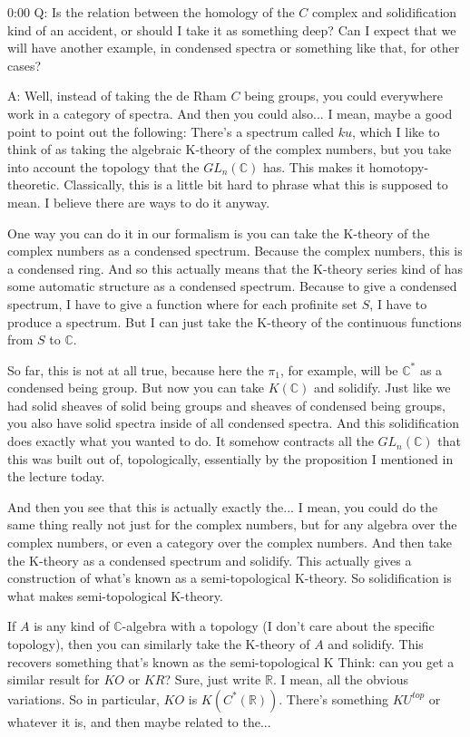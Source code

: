 \begin{unfinished}{0:00}
Q: Is the relation between the homology of the $C$ complex and solidification kind of an accident, or should I take it as something deep? Can I expect that we will have another example, in condensed spectra or something like that, for other cases?

A: Well, instead of taking the de Rham $C$ being groups, you could everywhere work in a category of spectra. And then you could also... I mean, maybe a good point to point out the following: There's a spectrum called $ku$, which I like to think of as taking the algebraic K-theory of the complex numbers, but you take into account the topology that the $GL_n(\mathbb{C})$ has. This makes it homotopy-theoretic. Classically, this is a little bit hard to phrase what this is supposed to mean. I believe there are ways to do it anyway.

One way you can do it in our formalism is you can take the K-theory of the complex numbers as a condensed spectrum. Because the complex numbers, this is a condensed ring. And so this actually means that the K-theory series kind of has some automatic structure as a condensed spectrum. Because to give a condensed spectrum, I have to give a function where for each profinite set $S$, I have to produce a spectrum. But I can just take the K-theory of the continuous functions from $S$ to $\mathbb{C}$.

So far, this is not at all true, because here the $\pi_1$, for example, will be $\mathbb{C}^*$ as a condensed being group. But now you can take $K(\mathbb{C})$ and solidify. Just like we had solid sheaves of solid being groups and sheaves of condensed being groups, you also have solid spectra inside of all condensed spectra. And this solidification does exactly what you wanted to do. It somehow contracts all the $GL_n(\mathbb{C})$ that this was built out of, topologically, essentially by the proposition I mentioned in the lecture today.

And then you see that this is actually exactly the... I mean, you could do the same thing really not just for the complex numbers, but for any algebra over the complex numbers, or even a category over the complex numbers. And then take the K-theory as a condensed spectrum and solidify. This actually gives a construction of what's known as a semi-topological K-theory. So solidification is what makes semi-topological K-theory.

If $A$ is any kind of $\mathbb{C}$-algebra with a topology (I don't care about the specific topology), then you can similarly take the K-theory of $A$ and solidify. This recovers something that's known as the semi-topological K
Think: can you get a similar result for $KO$ or $KR$? Sure, just write $\mathbb{R}$. I mean, all the obvious variations. So in particular, $KO$ is $K(C^*(\mathbb{R}))$. There's something $KU^{top}$ or whatever it is, and then maybe related to the...


\end{unfinished}
